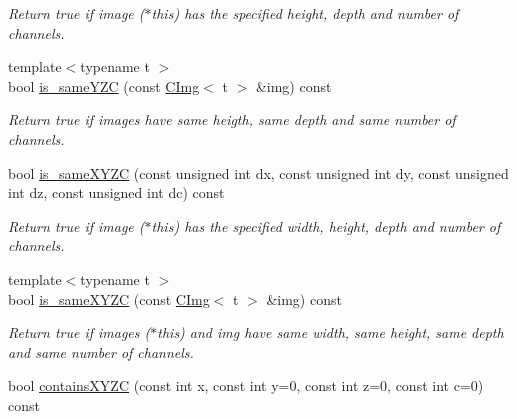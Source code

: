 \begin{DoxyCompactItemize}
\begin{DoxyCompactList}\small\item\em Return {\ttfamily true} if image ($\ast$this) has the specified height, depth and number of channels. \item\end{DoxyCompactList}\item 
\hypertarget{structcimg__library_1_1CImg_a8c3bd3a2a08f049484197a65f97429c1}{
{\footnotesize template$<$typename t $>$ }\\bool \hyperlink{structcimg__library_1_1CImg_a8c3bd3a2a08f049484197a65f97429c1}{is\_\-sameYZC} (const \hyperlink{structcimg__library_1_1CImg}{CImg}$<$ t $>$ \&img) const }
\label{structcimg__library_1_1CImg_a8c3bd3a2a08f049484197a65f97429c1}

\begin{DoxyCompactList}\small\item\em Return {\ttfamily true} if images have same heigth, same depth and same number of channels. \item\end{DoxyCompactList}\item 
\hypertarget{structcimg__library_1_1CImg_ae7f057fedc9005f4bcdaaf568bd9031a}{
bool \hyperlink{structcimg__library_1_1CImg_ae7f057fedc9005f4bcdaaf568bd9031a}{is\_\-sameXYZC} (const unsigned int dx, const unsigned int dy, const unsigned int dz, const unsigned int dc) const }
\label{structcimg__library_1_1CImg_ae7f057fedc9005f4bcdaaf568bd9031a}

\begin{DoxyCompactList}\small\item\em Return {\ttfamily true} if image ($\ast$this) has the specified width, height, depth and number of channels. \item\end{DoxyCompactList}\item 
\hypertarget{structcimg__library_1_1CImg_a75a2889c78991b49f178a7a62013d9a1}{
{\footnotesize template$<$typename t $>$ }\\bool \hyperlink{structcimg__library_1_1CImg_a75a2889c78991b49f178a7a62013d9a1}{is\_\-sameXYZC} (const \hyperlink{structcimg__library_1_1CImg}{CImg}$<$ t $>$ \&img) const }
\label{structcimg__library_1_1CImg_a75a2889c78991b49f178a7a62013d9a1}

\begin{DoxyCompactList}\small\item\em Return {\ttfamily true} if images {\ttfamily }($\ast$this) and {\ttfamily img} have same width, same height, same depth and same number of channels. \item\end{DoxyCompactList}\item 
\hypertarget{structcimg__library_1_1CImg_a910615239614a1094f62fb8beec0a1f9}{
bool \hyperlink{structcimg__library_1_1CImg_a910615239614a1094f62fb8beec0a1f9}{containsXYZC} (const int x, const int y=0, const int z=0, const int c=0) const }
\label{structcimg__library_1_1CImg_a910615239614a1094f62fb8beec0a1f9}


\end{DoxyCompactItemize}
